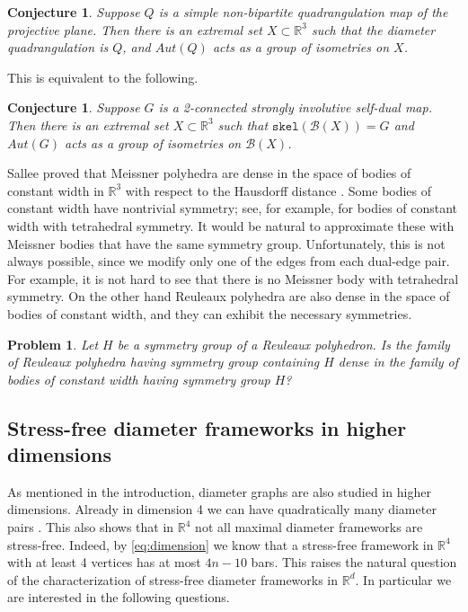 \documentclass{article}
\newtheorem{conjecture}[theorem]{Conjecture}
\newtheorem{problem}[theorem]{Problem}
\newcounter{example}
\newcommand{\R}[0]{\mathbb{R}}
\newcommand{\Bc}[0]{\mathcal{B}}
\newcommand{\skel}[0]{\mathtt{skel}}
\begin{document}
\begin{conjecture}
    Suppose $Q$ is a simple non-bipartite quadrangulation map of the projective plane. Then there is an extremal set $X\subset \R^3$ such that the diameter quadrangulation is $Q$, and $Aut(Q)$ acts as a group of isometries on $X$. 
\end{conjecture}

This is equivalent to the following.

\begin{conjecture}
    Suppose $G$ is a 2-connected strongly involutive self-dual map.  Then there is an extremal set $X\subset \R^3$ such that $\skel (\Bc(X))=G$ and $Aut(G)$ acts as a group of isometries on $\Bc(X)$. 
\end{conjecture}



Sallee proved that Meissner polyhedra are dense in the space of bodies of constant width in $\R^3$ with respect to the Hausdorff distance \cite{sallee1970reuleaux, hynd2024density}. Some bodies of constant width have nontrivial symmetry; see, for example, \cite{arman2024small,arman2025small} for bodies of constant width with tetrahedral symmetry. It would be natural to approximate these with Meissner bodies that have the same symmetry group. Unfortunately, this is not always possible, since we modify only one of the edges from each dual-edge pair. For example, it is not hard to see that there is no Meissner body with tetrahedral symmetry. On the other hand Reuleaux polyhedra are also dense in the space of bodies of constant width, and they can exhibit the necessary symmetries. 
\begin{problem}\label{prob:densesym}
    Let $H$ be a symmetry group of a Reuleaux polyhedron. Is the family of Reuleaux polyhedra having symmetry group containing $H$ dense in the family of bodies of constant width having symmetry group $H$?
    
\end{problem} 




\subsection{Stress-free diameter frameworks in higher dimensions}
As mentioned in the introduction, diameter graphs are also studied in higher dimensions. Already in dimension 4 we can have quadratically many diameter pairs \cite{erdHos1959sets,swanepoel2009unit}. This also shows that in $\R^4$ not all maximal diameter frameworks are stress-free. Indeed, by \eqref{eq:dimension} we know that a stress-free framework in $\R^4$ with at least 4 vertices has at most $4n-10$ bars. This raises the  natural question of the characterization of stress-free diameter frameworks in $\R^d$. In particular we are interested in the following questions.
\end{document}
